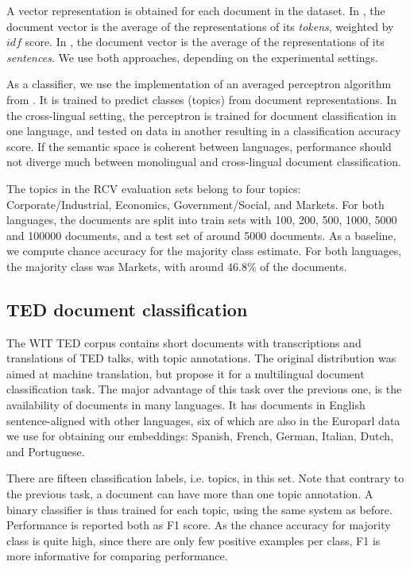A vector representation is obtained for each document in the dataset. In \cite{klementiev2012inducing}, the document vector is the average of the representations of its \emph{tokens}, weighted by $idf$ score. In \cite{hermann2013multilingual}, the document vector is the average of the representations of its \emph{sentences}. We use both approaches, depending on the experimental settings.

As a classifier, we use the implementation of an averaged perceptron algorithm from \cite{klementiev2012inducing}. It is trained to predict classes (topics) from document representations. In the cross-lingual setting, the perceptron is trained for document classification in one language, and tested on data in another resulting in a classification accuracy score. If the semantic space is coherent between languages, performance should not diverge much between monolingual and cross-lingual document classification. 

The topics in the RCV evaluation sets belong to four topics: Corporate/Industrial, Economics, Government/Social, and Markets.
For both languages, the documents are split into train sets with 100, 200, 500, 1000, 5000 and 100000 documents, and a test set of around 5000 documents.
As a baseline, we compute chance accuracy for the majority class estimate. For both languages, the majority class was Markets, with around 46.8\% of the documents.

\subsection{TED document classification}
The WIT TED corpus \cite{cettolo2012} contains short documents with transcriptions and translations of TED talks, with topic annotations. The original distribution was aimed at machine translation, but \cite{hermann2014multilingual} propose it for a multilingual document classification task. The major advantage of this task over the previous one, is the availability of documents in many languages. It has documents in English sentence-aligned with other languages, six of which are also in the Europarl data we use for obtaining our embeddings: Spanish, French, German, Italian, Dutch, and Portuguese.

There are fifteen classification labels, i.e. topics, in this set.
Note that contrary to the previous task, a document can have more than one topic annotation. A binary classifier is thus trained for each topic, using the same system as before. Performance is reported both as F1 score. As the chance accuracy for majority class is quite high, since there are only few positive examples per class, F1 is more informative for comparing performance. 

